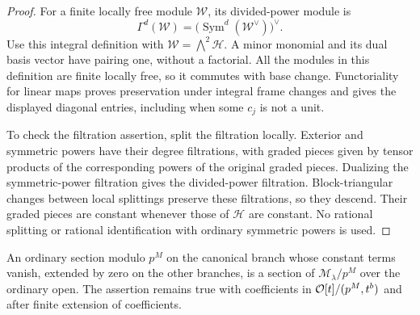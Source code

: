 \begin{proof}
For a finite locally free module $\mathcal W$, its divided-power
module is
\[
       \Gamma^d(\mathcal W)
          =\bigl(\operatorname{Sym}^d(\mathcal W^\vee)\bigr)^\vee.
\]
Use this integral definition with
$\mathcal W=\bigwedge^2\mathcal H$.  A minor monomial and its dual
basis vector have pairing one, without a factorial.  All the modules
in this definition are finite locally free, so it commutes with
base change.  Functoriality for linear maps proves preservation
under integral frame changes and gives the displayed diagonal
entries, including when some $c_j$ is not a unit.

To check the filtration assertion, split the filtration locally.
Exterior and symmetric powers have their degree filtrations, with
graded pieces given by tensor products of the corresponding powers
of the original graded pieces.  Dualizing the symmetric-power
filtration gives the divided-power filtration.  Block-triangular
changes between local splittings preserve these filtrations, so
they descend.  Their graded pieces are constant whenever those of
$\mathcal H$ are constant.  No rational splitting or rational
identification with ordinary symmetric powers is used.
\end{proof}

\begin{lemma}
\label{lem:cusp-base-change}
An ordinary section modulo $p^M$ on the canonical branch whose
constant terms vanish, extended by zero on the other branches,
is a section of $\mathcal M_\lambda/p^M$ over the ordinary open.
The assertion remains true with coefficients in
$\mathcal O[t]/(p^M,t^b)$ and after finite extension of coefficients.
\end{lemma}

